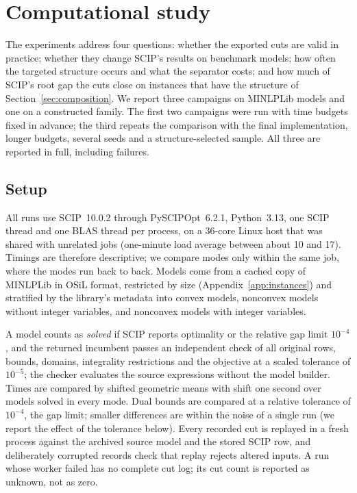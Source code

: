 \section{Computational study}\label{sec:computations}

The experiments address four questions: whether the exported cuts are
valid in practice; whether they change SCIP's results on benchmark
models; how often the targeted structure occurs and what the separator
costs; and how much of SCIP's root gap the cuts close on instances that
have the structure of Section~\ref{sec:composition}. We report three
campaigns on MINLPLib models and one on a constructed family. The first
two campaigns were run with time budgets fixed in advance; the third
repeats the comparison with the final implementation, longer budgets,
several seeds and a structure-selected sample. All three are reported in
full, including failures.

\subsection{Setup}\label{sec:setup}

All runs use SCIP~10.0.2 through PySCIPOpt~6.2.1, Python~3.13, one SCIP
thread and one BLAS thread per process, on a 36-core Linux host that was
shared with unrelated jobs (one-minute load average between about 10 and
17). Timings are therefore descriptive; we compare modes only within
the same job, where the modes run back to back. Models come from a cached
copy of MINLPLib \citep{BussieckDrudMeeraus2003} in OSiL format, restricted
by size (Appendix~\ref{app:instances}) and stratified by the library's
metadata into convex models, nonconvex models without integer variables,
and nonconvex models with integer variables.

A model counts as \emph{solved} if SCIP reports optimality or the relative
gap limit $10^{-4}$, and the returned incumbent passes an independent check
of all original rows, bounds, domains, integrality restrictions and the
objective at a scaled tolerance of $10^{-5}$; the checker evaluates the
source expressions without the model builder. Times are compared by
shifted geometric means with shift one second over models solved in every
mode. Dual bounds are compared at a relative tolerance of $10^{-4}$, the
gap limit; smaller differences are within the noise of a single run (we
report the effect of the tolerance below). Every recorded cut is replayed
in a fresh process against the archived source model and the stored SCIP
row, and deliberately corrupted records check that replay rejects
altered inputs. A run whose worker failed has no complete cut log; its cut
count is reported as unknown, not as zero.

